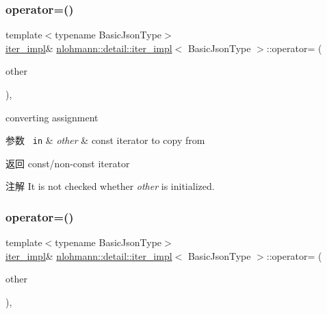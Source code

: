 \subsubsection{\texorpdfstring{operator=()}{operator=()}\hspace{0.1cm}{\footnotesize\ttfamily [1/2]}}
{\footnotesize\ttfamily template$<$typename Basic\+Json\+Type$>$ \\
\mbox{\hyperlink{classnlohmann_1_1detail_1_1iter__impl}{iter\+\_\+impl}}\& \mbox{\hyperlink{classnlohmann_1_1detail_1_1iter__impl}{nlohmann\+::detail\+::iter\+\_\+impl}}$<$ Basic\+Json\+Type $>$\+::operator= (\begin{DoxyParamCaption}\item[{const \mbox{\hyperlink{classnlohmann_1_1detail_1_1iter__impl}{iter\+\_\+impl}}$<$ const Basic\+Json\+Type $>$ \&}]{other }\end{DoxyParamCaption})\hspace{0.3cm}{\ttfamily [inline]}, {\ttfamily [noexcept]}}



converting assignment 


\begin{DoxyParams}[1]{参数}
\mbox{\texttt{ in}}  & {\em other} & const iterator to copy from \\
\hline
\end{DoxyParams}
\begin{DoxyReturn}{返回}
const/non-\/const iterator 
\end{DoxyReturn}
\begin{DoxyNote}{注解}
It is not checked whether {\itshape other} is initialized. 
\end{DoxyNote}
\mbox{\label{classnlohmann_1_1detail_1_1iter__impl_a7159ed1cfe7c423a2baef8bea0c94509}} 
\subsubsection{\texorpdfstring{operator=()}{operator=()}\hspace{0.1cm}{\footnotesize\ttfamily [2/2]}}
{\footnotesize\ttfamily template$<$typename Basic\+Json\+Type$>$ \\
\mbox{\hyperlink{classnlohmann_1_1detail_1_1iter__impl}{iter\+\_\+impl}}\& \mbox{\hyperlink{classnlohmann_1_1detail_1_1iter__impl}{nlohmann\+::detail\+::iter\+\_\+impl}}$<$ Basic\+Json\+Type $>$\+::operator= (\begin{DoxyParamCaption}\item[{const \mbox{\hyperlink{classnlohmann_1_1detail_1_1iter__impl}{iter\+\_\+impl}}$<$ typename std\+::remove\+\_\+const$<$ Basic\+Json\+Type $>$\+::type $>$ \&}]{other }\end{DoxyParamCaption})\hspace{0.3cm}{\ttfamily [inline]}, {\ttfamily [noexcept]}}



